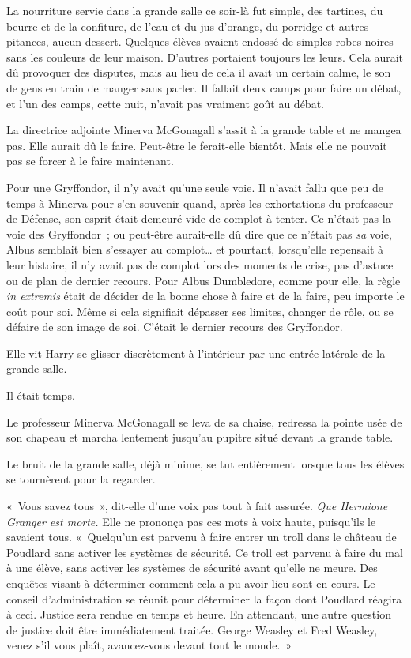\later

La nourriture servie dans la grande salle ce soir-là fut simple, des tartines, du beurre et de la confiture, de l'eau et du jus d'orange, du porridge et autres pitances, aucun dessert. Quelques élèves avaient endossé de simples robes noires sans les couleurs de leur maison. D'autres portaient toujours les leurs. Cela aurait dû provoquer des disputes, mais au lieu de cela il avait un certain calme, le son de gens en train de manger sans parler. Il fallait deux camps pour faire un débat, et l'un des camps, cette nuit, n'avait pas vraiment goût au débat.

La directrice adjointe Minerva McGonagall s'assit à la grande table et ne mangea pas. Elle aurait dû le faire. Peut-être le ferait-elle bientôt. Mais elle ne pouvait pas se forcer à le faire maintenant.

Pour une Gryffondor, il n'y avait qu'une seule voie. Il n'avait fallu que peu de temps à Minerva pour s'en souvenir quand, après les exhortations du professeur de Défense, son esprit était demeuré vide de complot à tenter. Ce n'était pas la voie des Gryffondor~; ou peut-être aurait-elle dû dire que ce n'était pas \emph{sa} voie, Albus semblait bien s'essayer au complot… et pourtant, lorsqu'elle repensait à leur histoire, il n'y avait pas de complot lors des moments de crise, pas d'astuce ou de plan de dernier recours. Pour Albus Dumbledore, comme pour elle, la règle \emph{in extremis} était de décider de la bonne chose à faire et de la faire, peu importe le coût pour soi. Même si cela signifiait dépasser ses limites, changer de rôle, ou se défaire de son image de soi. C'était le dernier recours des Gryffondor.

Elle vit Harry se glisser discrètement à l'intérieur par une entrée latérale de la grande salle.

Il était temps.

Le professeur Minerva McGonagall se leva de sa chaise, redressa la pointe usée de son chapeau et marcha lentement jusqu'au pupitre situé devant la grande table.

Le bruit de la grande salle, déjà minime, se tut entièrement lorsque tous les élèves se tournèrent pour la regarder.

«~Vous savez tous~», dit-elle d'une voix pas tout à fait assurée. \emph{Que Hermione Granger est morte.} Elle ne prononça pas ces mots à voix haute, puisqu'ils le savaient tous. «~Quelqu'un est parvenu à faire entrer un troll dans le château de Poudlard sans activer les systèmes de sécurité. Ce troll est parvenu à faire du mal à une élève, sans activer les systèmes de sécurité avant qu'elle ne meure. Des enquêtes visant à déterminer comment cela a pu avoir lieu sont en cours. Le conseil d'administration se réunit pour déterminer la façon dont Poudlard réagira à ceci. Justice sera rendue en temps et heure. En attendant, une autre question de justice doit être immédiatement traitée. George Weasley et Fred Weasley, venez s'il vous plaît, avancez-vous devant tout le monde.~»

